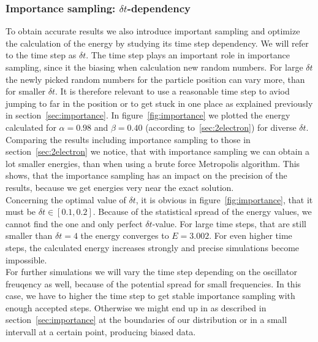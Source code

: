 \subsubsection{Importance sampling: $\delta t$-dependency}
To obtain accurate results we also introduce important sampling and optimize the calculation of the energy by studying its time step dependency. We will refer to the time step as $\delta t$. The time step plays an important role in importance sampling, since it the biasing when calculation new random numbers. For large $\delta t$ the newly picked random numbers for the particle position can vary more, than for smaller $\delta t$. It is therefore relevant to use a reasonable time step to aviod jumping to far in the position or to get stuck in one place as explained previously in section~\ref{sec:importance}. In figure~\ref{fig:importance} we plotted the energy calculated for $\alpha = 0.98$ and $\beta = 0.40$ (according to~\ref{sec:2electron}) for diverse $\delta t$. Comparing the results including importance sampling to those in section~\ref{sec:2electron} we notice, that with importance sampling we can obtain a lot smaller energies, than when using a brute force Metropolis algorithm. This shows, that the importance sampling has an impact on the precision of the results, because we get energies very near the exact solution.\\
Concerning the optimal value of $\delta t$, it is obvious in figure~\ref{fig:importance}, that it must be $\delta t \in [0.1,0.2]$. Because of the statistical spread of the energy values, we cannot find the one and only perfect $\delta t$-value. For large time steps, that are still smaller than $\delta t= 4$ the energy converges to $E=3.002$. For even higher time steps, the calculated energy increases strongly and precise simulations become impossible.\\
For further simulations we will vary the time step depending on the oscillator freuqency as well, because of the potential spread for small frequencies. In this case, we have to higher the time step to get stable importance sampling with enough accepted steps. Otherwise we might end up in as described in section~\ref{sec:importance} at the boundaries of our distribution or in a small intervall at a certain point, producing biased data.
